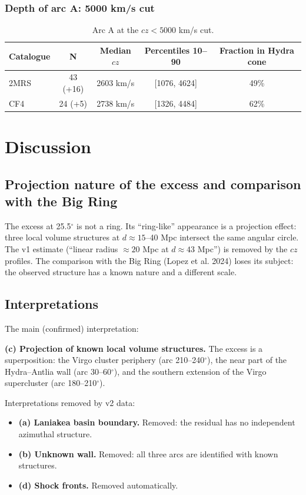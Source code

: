 \documentclass[11pt,a4paper]{article}
\begin{document}
\subsubsection{Depth of arc A: 5000 km/s cut}
\begin{table}[H]
\centering
\caption{Arc A at the \(cz < 5000\) km/s cut.}
\begin{tabular}{lcccc}
\toprule
\textbf{Catalogue} & \textbf{N} & \textbf{Median \(cz\)} & \textbf{Percentiles 10--90} & \textbf{Fraction in Hydra cone} \\
\midrule
2MRS & 43 (+16) & 2603 km/s & [1076, 4624] & 49\% \\
CF4  & 24 (+5)  & 2738 km/s & [1326, 4484] & 62\% \\
\bottomrule
\end{tabular}
\end{table}

\section{Discussion}
\subsection{Projection nature of the excess and comparison with the Big Ring}
The excess at 25.5\(^\circ\) is not a ring. Its ``ring-like'' appearance is a projection effect: three local volume structures at \(d \approx 15\)--40 Mpc intersect the same angular circle. The v1 estimate (``linear radius \(\approx 20\) Mpc at \(d \approx 43\) Mpc'') is removed by the \(cz\) profiles. The comparison with the Big Ring (Lopez et al. 2024) loses its subject: the observed structure has a known nature and a different scale.

\subsection{Interpretations}
The main (confirmed) interpretation:

\textbf{(c) Projection of known local volume structures.} The excess is a superposition: the Virgo cluster periphery (arc 210--240\(^\circ\)), the near part of the Hydra--Antlia wall (arc 30--60\(^\circ\)), and the southern extension of the Virgo supercluster (arc 180--210\(^\circ\)).

Interpretations removed by v2 data:
\begin{itemize}
\item \textbf{(a) Laniakea basin boundary.} Removed: the residual has no independent azimuthal structure.
\item \textbf{(b) Unknown wall.} Removed: all three arcs are identified with known structures.
\item \textbf{(d) Shock fronts.} Removed automatically.
\end{itemize}
\end{document}
